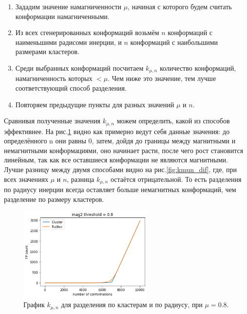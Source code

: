 \begin{enumerate}
	\item Зададим значение намагниченности $\mu$, начиная с которого будем считать конформации намагниченными.
	\item Из всех сгенерированных конформаций возьмём $n$ конформаций с наименьшими радисоми инерции, и $n$ конформаций с наибольшими размерами кластеров.
	\item Среди выбранных конформаций посчитаем $k_{\mu, n}$ количество конформаций, намагниченность которых $< \mu$. Чем ниже это значение, тем лучше соответствующий способ разделения.
	\item Повторяем предыдущие пункты для разных значений $\mu$ и $n$.
\end{enumerate}

Сравнивая полученные значения $k_{\mu, n}$ можем определить, какой из способов эффективнее. На рис.\ref{fig:kmun_example} видно как примерно ведут себя данные значения: до определённого n они равны 0, затем, дойдя до границы между магнитными и немагнитными конформациями, оно начинает расти, после чего рост становится линейным, так как все оставшиеся конформации не являются магнитными. 
Лучше разницу между двумя способами видно на рис.\ref{fig:kmun_dif}, где, при всех значениях $\mu$ и $n$, разница $k_{\mu, n}$ остаётся отрицательной. То есть разделения по радиусу инерции всегда оставляет больше немагнитных конформаций, чем разделение по размеру кластеров.

\begin{figure}[h]
	\centering
	\includegraphics[width=0.6\textwidth]{../images/cluster_and_radius_mu0.8.png} 
	\caption{График $k_{\mu, n}$ для разделения по кластерам и по радиусу, при $\mu = 0.8$.}
	\label{fig:kmun_example}
\end{figure}

